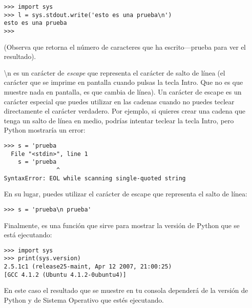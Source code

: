 \begin{listingignore}
\begin{verbatim}
>>> import sys
>>> l = sys.stdout.write('esto es una prueba\n')
esto es una prueba
>>>
\end{verbatim}
\end{listingignore}

\noindent
(Observa que  retorna el número de caracteres que ha escrito---prueba  para ver el resultado).

\noindent
{\textbackslash}n es un carácter de \emph{escape}  que representa el carácter de salto de línea (el carácter que se imprime en pantalla cuando pulsas la tecla Intro. Que no es que muestre nada en pantalla, es que cambia de línea).  Un carácter de escape es un carácter especial que puedes utilizar en las cadenas cuando no puedes teclear directamente el carácter verdadero.   Por ejemplo, si quieres crear una cadena que tenga un salto de línea en medio, podrías intentar teclear la tecla Intro, pero Python mostraría un error:

\begin{listing}
\begin{verbatim}
>>> s = 'prueba 
  File "<stdin>", line 1
    s = 'prueba 
               ^
SyntaxError: EOL while scanning single-quoted string
\end{verbatim}
\end{listing}

En su lugar, puedes utilizar el carácter de escape que representa el salto de línea:
\begin{listing}
\begin{verbatim}
>>> s = 'prueba\n prueba'
\end{verbatim}
\end{listing}

\noindent
Finalmente,  es una función que sirve para mostrar la versión de Python que se está ejecutando:

\begin{listingignore}
\begin{verbatim}
>>> import sys
>>> print(sys.version)
2.5.1c1 (release25-maint, Apr 12 2007, 21:00:25) 
[GCC 4.1.2 (Ubuntu 4.1.2-0ubuntu4)]
\end{verbatim}
\end{listingignore}

En este caso el resultado que se muestre en tu consola dependerá de la versión de Python y de Sistema Operativo que estés ejecutando.


